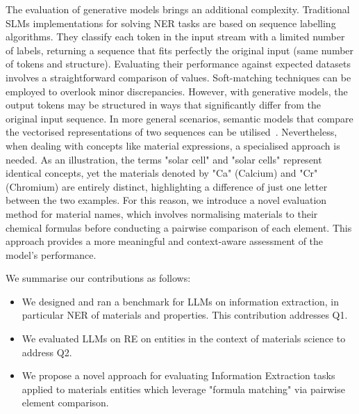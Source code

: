 The evaluation of generative models brings an additional complexity. 
Traditional SLMs implementations for solving NER tasks are based on sequence labelling algorithms. They classify each token in the input stream with a limited number of labels, returning a sequence that fits perfectly the original input (same number of tokens and structure). 
Evaluating their performance against expected datasets involves a straightforward comparison of values. Soft-matching techniques can be employed to overlook minor discrepancies. 
However, with generative models, the output tokens may be structured in ways that significantly differ from the original input sequence. 
In more general scenarios, semantic models that compare the vectorised representations of two sequences can be utilised~\cite{reimers2019sentencebert}. 
Nevertheless, when dealing with concepts like material expressions, a specialised approach is needed. 
As an illustration, the terms "solar cell" and "solar cells" represent identical concepts, yet the materials denoted by "Ca" (Calcium) and "Cr" (Chromium) are entirely distinct, highlighting a difference of just one letter between the two examples.
For this reason, we introduce a novel evaluation method for material names, which involves normalising materials to their chemical formulas before conducting a pairwise comparison of each element. This approach provides a more meaningful and context-aware assessment of the model's performance.

We summarise our contributions as follows: 

\begin{itemize}
    \item We designed and ran a benchmark for LLMs on information extraction, in particular NER of materials and properties. This contribution addresses Q1. 
    \item We evaluated LLMs on RE on entities in the context of materials science to address Q2.
    \item We propose a novel approach for evaluating Information Extraction tasks applied to materials entities which leverage "formula matching" via pairwise element comparison.
\end{itemize}




